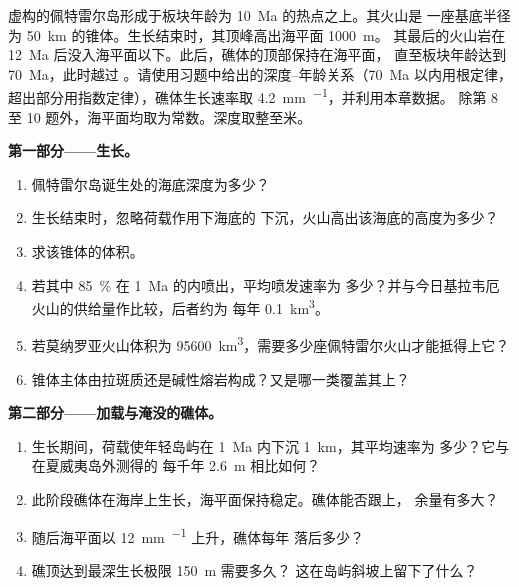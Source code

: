 \begin{problem}\label{pb:b2:oceanic-islands:1}
虚构的佩特雷尔岛形成于板块年龄为 \qty{10}{Ma} 的热点之上。其火山是
一座基底半径为 \qty{50}{km} 的锥体。生长结束时，其顶峰高出海平面 \qty{1000}{m}。
其最后的火山岩在 \qty{12}{Ma} 后没入海平面以下。此后，礁体的顶部保持在海平面，
直至板块年龄达到 \qty{70}{Ma}，此时越过
。请使用习题中给出的深度–年龄关系（\qty{70}{Ma} 以内用根定律，
超出部分用指数定律），礁体生长速率取 \qty{4.2}{mm.^{-1}}，并利用本章数据。
除第 8 至 10 题外，海平面均取为常数。深度取整至米。

\noindent\textbf{第一部分——生长。}
\begin{enumerate}
  \item 佩特雷尔岛诞生处的海底深度为多少？
  \item 生长结束时，忽略荷载作用下海底的
        下沉，火山高出该海底的高度为多少？
  \item 求该锥体的体积。
  \item 若其中 \qty{85}{\percent} 在 \qty{1}{Ma} 的内喷出，平均喷发速率为
        多少？并与今日基拉韦厄火山的供给量作比较，后者约为
        每年 \qty{0.1}{km^3}。
  \item 若莫纳罗亚火山体积为 \qty{95600}{km^3}，需要多少座佩特雷尔火山才能抵得上它？
  \item 锥体主体由拉斑质还是碱性熔岩构成？又是哪一类覆盖其上？
\end{enumerate}

\noindent\textbf{第二部分——加载与淹没的礁体。}
\begin{enumerate}[resume]
  \item 生长期间，荷载使年轻岛屿在 \qty{1}{Ma} 内下沉 \qty{1}{km}，其平均速率为
        多少？它与在夏威夷岛外测得的
        每千年 \qty{2.6}{m} 相比如何？
  \item 此阶段礁体在海岸上生长，海平面保持稳定。礁体能否跟上，
        余量有多大？
  \item 随后海平面以 \qty{12}{mm.^{-1}} 上升，礁体每年
        落后多少？
  \item 礁顶达到最深生长极限 \qty{150}{m} 需要多久？
        这在岛屿斜坡上留下了什么？
\end{enumerate}


\end{problem}
